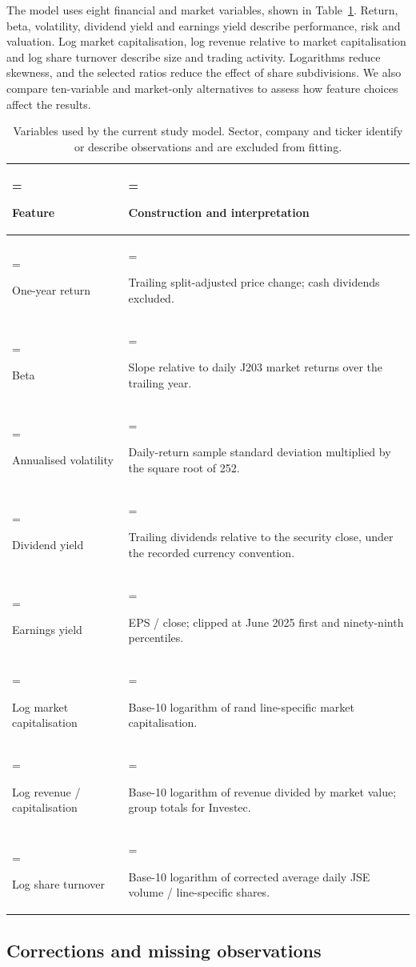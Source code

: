 The model uses eight financial and market variables, shown in Table~\ref{tab:2}. Return, beta, volatility, dividend yield and earnings yield describe performance, risk and valuation. Log market capitalisation, log revenue relative to market capitalisation and log share turnover describe size and trading activity. Logarithms reduce skewness, and the selected ratios reduce the effect of share subdivisions. We also compare ten-variable and market-only alternatives to assess how feature choices affect the results.


\begin{table}[htbp]
\centering\caption{Variables used by the current study model. Sector, company and ticker identify or describe observations and are excluded from fitting.}\label{tab:2}
\footnotesize
\begin{tabularx}{\linewidth}{@{}>{\hsize=0.560\hsize\linewidth=\hsize\raggedright\arraybackslash}X >{\hsize=1.440\hsize\linewidth=\hsize\raggedright\arraybackslash}X@{}}
\toprule
Feature & Construction and interpretation \\
\midrule
One-year return & Trailing split-adjusted price change; cash dividends excluded. \\
Beta & Slope relative to daily J203 market returns over the trailing year. \\
Annualised volatility & Daily-return sample standard deviation multiplied by the square root of 252. \\
Dividend yield & Trailing dividends relative to the security close, under the recorded currency convention. \\
Earnings yield & EPS / close; clipped at June 2025 first and ninety-ninth percentiles. \\
Log market capitalisation & Base-10 logarithm of rand line-specific market capitalisation. \\
Log revenue / capitalisation & Base-10 logarithm of revenue divided by market value; group totals for Investec. \\
Log share turnover & Base-10 logarithm of corrected average daily JSE volume / line-specific shares. \\
\bottomrule
\end{tabularx}
\end{table}


\subsection{Corrections and missing observations}

